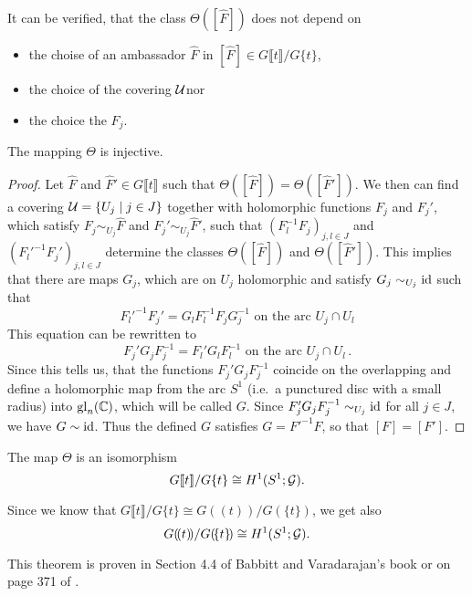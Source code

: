 It can be verified, that the class $\Theta([\hat F])$ does not depend on
\begin{itemize}
  \item the choise of an ambassador $\hat F$ in
    $[\hat F]\in G\llbracket t\rrbracket/G\{t\}$\PROBLEM[proof!],
  \item the choice of the covering $\mathcal{U}$\PROBLEM[proof!] nor
  \item the choice the $F_j$\PROBLEM[proof!].
\end{itemize}
\begin{lem}
  The mapping $\Theta$ is injective.
\end{lem}
\begin{proof}
  Let $\hat F$ and $\hat F'\in G\llbracket t\rrbracket$ such that
  $\Theta([\hat F])=\Theta([\hat F'])$.
  We then can find a covering $\mathcal{U}=\{U_j\mid j\in J\}$ together with
  holomorphic functions $F_j$ and $F_j'$, which satisfy
  $F_j\sim_{U_j}\hat F$ and $F_j'\sim_{U_j}\hat F'$, such that
  $(F_l^{-1}F_j)_{j,l\in J}$ and $(F_l'^{-1}F_j')_{j,l\in J}$ determine the
  classes $\Theta([\hat F])$ and $\Theta([\hat F'])$.
  This implies that there are maps $G_j$, which are on $U_j$ holomorphic and
  satisfy $G_j\sim_{U_j}\operatorname{id}$ such that
  \[
    F_l'^{-1}F_j'=G_lF_l^{-1}F_jG_j^{-1}
    \text{~on~the~arc~} U_j\cap U_l
  \]
  This equation can be rewritten to
  \[
    F_j'G_jF_j^{-1}=F_l'G_lF_l^{-1}
    \text{~on~the~arc~} U_j\cap U_l \,.
  \]
  Since this tells us, that the functions $F_j'G_jF_j^{-1}$ coincide on
  the overlapping and define a holomorphic map from the arc $S^1$ (i.e.\ a
  punctured disc with a small radius) into $\operatorname{gl}_n(\mathbb{C})$, which will be called
  $G$.
  Since $F_j'G_jF_j^{-1}\sim_{U_j}\operatorname{id}$ for all $j\in J$, we have
  $G\sim\operatorname{id}$.
  Thus the defined $G$ satisfies $G=F'^{-1}F$, so that $[F]=[F']$.
\end{proof}
\begin{thm}\label{thm:thm1helpMalgSibuy}
  The map $\Theta$ is an isomorphism
  \[
    G\llbracket t\rrbracket/G\{t\}\cong H^1(S^1;\mathcal{G}).
  \]
  \begin{s-rem}
    Since we know that
    $G\llbracket t\rrbracket/G\{t\}\cong G(\!(t)\!)/G(\!\{t\}\!)$\TODO[(cf~??)],
    we get also
    \[
      G(\!(t)\!)/G(\!\{t\}\!)\cong H^1(S^1;\mathcal{G}).
    \]
  \end{s-rem}
\end{thm}
This theorem is proven in Section 4.4 of Babbitt and Varadarajan's book
\cite{babbitt1989local} or on page 371 of \cite{Martinet1991}.

